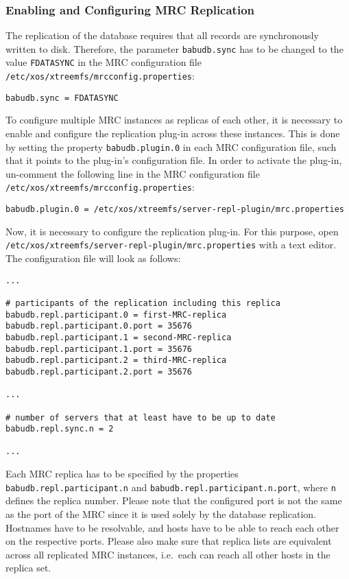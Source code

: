 \documentclass[a4paper,10pt]{book}
\begin{document}
\subsubsection{Enabling and Configuring MRC Replication}
The replication of the database requires that all records are synchronously written to disk. Therefore, the parameter \texttt{babudb.sync} has to be changed to the value \texttt{FDATASYNC} in the MRC configuration file \texttt{/etc/xos/xtreemfs/mrcconfig.properties}:
\begin{verbatim}
babudb.sync = FDATASYNC
\end{verbatim}

To configure multiple MRC instances as replicas of each other, it is necessary to enable and configure the replication plug-in across these instances. This is done by setting the property \texttt{babudb.plugin.0} in each MRC configuration file, such that it points to the plug-in's configuration file. In order to activate the plug-in, un-comment the following line in the MRC configuration file \texttt{/etc/xos/xtreemfs/mrcconfig.properties}:

\begin{verbatim}
babudb.plugin.0 = /etc/xos/xtreemfs/server-repl-plugin/mrc.properties
\end{verbatim}

Now, it is necessary to configure the replication plug-in. For this purpose, open \texttt{/etc/xos/xtreemfs/server-repl-plugin/mrc.properties} with a text editor. The configuration file will look as follows:

\begin{verbatim}
...

# participants of the replication including this replica
babudb.repl.participant.0 = first-MRC-replica
babudb.repl.participant.0.port = 35676
babudb.repl.participant.1 = second-MRC-replica
babudb.repl.participant.1.port = 35676
babudb.repl.participant.2 = third-MRC-replica
babudb.repl.participant.2.port = 35676

...

# number of servers that at least have to be up to date
babudb.repl.sync.n = 2

...
\end{verbatim}


Each MRC replica has to be specified by the properties \texttt{babudb.repl.participant.n} and \texttt{babudb.repl.participant.n.port}, where \texttt{n} defines the replica number. Please note that the configured port is not the same as the port of the MRC since it is used solely by the database replication. Hostnames have to be resolvable, and hosts have to be able to reach each other on the respective ports. Please also make sure that replica lists are equivalent across all replicated MRC instances, i.e.\ each can reach all other hosts in the replica set.
\end{document}
